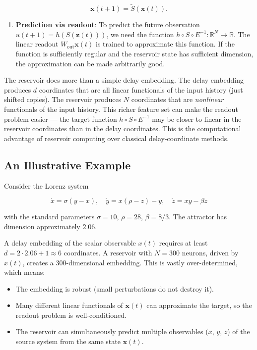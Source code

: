 \[
\mathbf{x}(t+1) = \tilde{S}(\mathbf{x}(t)).
\]

\begin{enumerate}[nosep]
  \item \textbf{Prediction via readout}: To predict the future observation $u(t+1) = h(S(\mathbf{z}(t)))$, we need the function $h \circ S \circ E^{-1}: \mathbb{R}^N \to \mathbb{R}$. The linear readout $W_{\text{out}} \mathbf{x}(t)$ is trained to approximate this function. If the function is sufficiently regular and the reservoir state has sufficient dimension, the approximation can be made arbitrarily good.
\end{enumerate}

\begin{remark}
The reservoir does more than a simple delay embedding. The delay embedding produces $d$ coordinates that are all linear functionals of the input history (just shifted copies). The reservoir produces $N$ coordinates that are \textit{nonlinear} functionals of the input history. This richer feature set can make the readout problem easier --- the target function $h \circ S \circ E^{-1}$ may be closer to linear in the reservoir coordinates than in the delay coordinates. This is the computational advantage of reservoir computing over classical delay-coordinate methods.
\end{remark}


\subsection{An Illustrative Example}\label{sec:16.5.4}

Consider the Lorenz system

\[
\dot{x} = \sigma(y - x), \quad \dot{y} = x(\rho - z) - y, \quad \dot{z} = xy - \beta z
\]

with the standard parameters $\sigma = 10$, $\rho = 28$, $\beta = 8/3$. The attractor has dimension approximately $2.06$.

A delay embedding of the scalar observable $x(t)$ requires at least $d = 2 \cdot 2.06 + 1 \approx 6$ coordinates. A reservoir with $N = 300$ neurons, driven by $x(t)$, creates a $300$-dimensional embedding. This is vastly over-determined, which means:
\begin{itemize}[nosep]
  \item The embedding is robust (small perturbations do not destroy it).
  \item Many different linear functionals of $\mathbf{x}(t)$ can approximate the target, so the readout problem is well-conditioned.
  \item The reservoir can simultaneously predict multiple observables ($x$, $y$, $z$) of the source system from the same state $\mathbf{x}(t)$.
\end{itemize}

